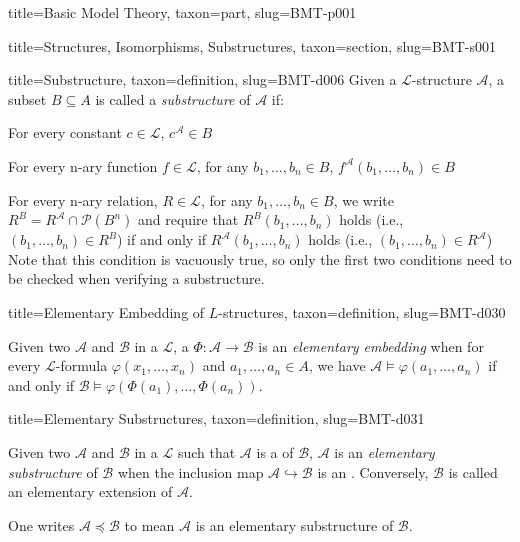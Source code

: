 \documentclass[a4paper]{article}
\begin{document}
\begin{tree}{title={Basic Model Theory}, taxon={part}, slug={BMT-p001}}
\begin{tree}{title={Structures, Isomorphisms, Substructures}, taxon={section}, slug={BMT-s001}}
\begin{tree}{title={Substructure}, taxon={definition}, slug={BMT-d006}}
Given a \(\mathcal {L}\)-structure \(\mathcal {A}\), a subset \(B  \subseteq  A\) is called a \emph{substructure} of \(\mathcal {A}\) if:\par{For every constant \(c \in   \mathcal {L}\), \(c^{ \mathcal {A}}  \in  B\)}\par{For every n-ary function \(f \in   \mathcal {L}\), for any \(b_1, \dots , b_n  \in  B\), \(f^{ \mathcal {A}}(b_1, \dots ,b_n)  \in  B\)}\par{For every n-ary relation, \(R \in   \mathcal {L}\), for any \(b_1, \dots , b_n  \in  B\), we write \(R^B = R^{ \mathcal {A}} \cap   \mathcal {P}(B^n)\) and require that
\(R^{B}(b_1, \dots , b_n)\) holds (i.e., \((b_1, \dots , b_n)  \in  R^{B}\))  if and only if \(R^{ \mathcal {A}}(b_1, \dots , b_n)\) holds (i.e., \((b_1, \dots , b_n)  \in  R^{ \mathcal {A}}\)) 
Note that this condition is vacuously true, so only the first two conditions need to be checked when verifying a substructure.}
\end{tree}

\begin{tree}{title={Elementary Embedding of \(L\)-structures}, taxon={definition}, slug={BMT-d030}}

    Given two  \(\mathcal {A}\) and \(\mathcal {B}\) in a  \(\mathcal {L}\),
    a  \(\Phi \colon \mathcal {A}  \to   \mathcal {B}\) is an \emph{elementary embedding} when
    for every \(\mathcal  L\)-formula \(\varphi (x_1, \dots ,x_n)\) and \(a_1, \dots ,a_n \in  A\),
    we have \(\mathcal  A \vDash \varphi (a_1, \dots ,a_n)\) if and only if \(\mathcal  B \vDash \varphi ( \Phi (a_1), \dots , \Phi (a_n))\).

\end{tree}

\begin{tree}{title={Elementary Substructures}, taxon={definition}, slug={BMT-d031}}

    Given two  \(\mathcal {A}\) and \(\mathcal {B}\) in a  \(\mathcal {L}\)
    such that \(\mathcal  A\) is a  of \(\mathcal  B\),
    \(\mathcal  A\) is an \emph{elementary substructure} of \(\mathcal  B\) when the inclusion map \(\mathcal  A \hookrightarrow \mathcal  B\)
    is an .
    Conversely, \(\mathcal  B\) is called an elementary extension of \(\mathcal  A\).
\par{
    One writes \(\mathcal  A \preceq \mathcal  B\) to mean \(\mathcal  A\) is an elementary substructure of \(\mathcal  B\).
}
\end{tree}


\end{tree}
\end{tree}
\end{document}
